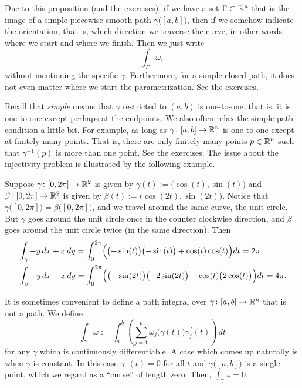 Due to this proposition (and the exercises), if we have a set $\Gamma
\subset {\mathbb{R}}^n$ that is the image of a simple piecewise smooth path
$\gamma\bigl([a,b]\bigr)$, then if we somehow indicate the orientation, that
is, which direction we traverse the curve, in other words where we start and
where we finish. Then we just write
\begin{equation*}
\int_{\Gamma} \omega ,
\end{equation*}
without mentioning the specific $\gamma$.
Furthermore, for a simple closed path, it does not even matter where we
start the parametrization.  See the exercises.

Recall that \emph{simple} means that $\gamma$ restricted to $(a,b)$ is
one-to-one, that is, it is one-to-one except perhaps at the endpoints.
We also often relax the simple path condition a little bit.
For example, as long as
$\gamma \colon [a,b] \to {\mathbb{R}}^n$ is one-to-one except at finitely many points.  That
is, there are only finitely many points $p \in {\mathbb{R}}^n$ such that
$\gamma^{-1}(p)$ is more than one point.  See the exercises.  The issue about the
injectivity
problem is illustrated by the following example.

\begin{example}
Suppose $\gamma \colon [0,2\pi] \to {\mathbb{R}}^2$ is given by $\gamma(t) :=
\bigl(\cos(t),\sin(t)\bigr)$ and
$\beta \colon [0,2\pi] \to {\mathbb{R}}^2$ is given by $\beta(t) :=
\bigl(\cos(2t),\sin(2t)\bigr)$.  Notice that
$\gamma\bigl([0,2\pi]\bigr) = \beta\bigl([0,2\pi]\bigr)$, and we travel
around the same curve, the unit circle.  But $\gamma$ goes around the unit
circle once in the counter clockwise direction, and $\beta$ goes around the
unit circle twice (in the same direction).  Then
\begin{align*}
& \int_{\gamma} -y\, dx + x\,dy
=
\int_0^{2\pi}
\Bigl( \bigl(-\sin(t) \bigr) \bigl(-\sin(t) \bigr) + \cos(t) \cos(t) \Bigr) dt
=
2 \pi,\\
& \int_{\beta} -y\, dx + x\,dy
=
\int_0^{2\pi}
\Bigl( \bigl(-\sin(2t) \bigr) \bigl(-2\sin(2t) \bigr) + \cos(t)
\bigl(2\cos(t)\bigr) \Bigr) dt
=
4 \pi.
\end{align*}
\end{example}

It is sometimes convenient to define a path integral over $\gamma \colon
[a,b] \to {\mathbb{R}}^n$ that is not a path.
We define
\begin{equation*}
\int_{\gamma} \omega := \int_a^b
\left(
\sum_{j=1}^n
\omega_j\bigl(\gamma(t)\bigr) \gamma_j^{\:\prime}(t)
\right) \, dt 
\end{equation*}
for any $\gamma$ which is continuously differentiable.  A 
case which comes up naturally is when $\gamma$ is constant.  In this case
$\gamma^{\:\prime}(t) = 0$ for all $t$ and $\gamma\bigl([a,b]\bigr)$ is a single
point, which we regard as a ``curve'' of length zero.  Then,
$\int_{\gamma} \omega = 0$.


